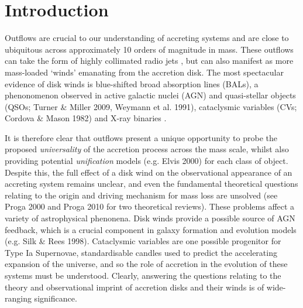 \documentclass[useAMS,usenatbib,onecolumn]{mn2e2}
\begin{document}



%
%
\section{Introduction}
Outflows are crucial to our understanding of accreting systems and are close to ubiquitous 
across approximately 10 orders of magnitude in mass. These outflows can take the form of 
highly collimated radio jets \citep{bellonijet2010}, but can also manifest as 
more mass-loaded `winds' emanating from the accretion disk. The most spectacular evidence of
disk winds is blue-shifted broad absorption lines (BALs), a phenonomenon observed in 
active galactic nuclei (AGN) and quasi-stellar objects (QSOs; Turner \& Miller 2009, 
Weymann et al. 1991\nocite{turnermiller2009, weymann1991}), cataclysmic variables 
(CVs; Cordova \& Mason 1982\nocite{cordova1982}) and X-ray binaries \citep{ioannau2003}.

It is therefore clear that outflows present a unique opportunity to probe the 
proposed {\sl universality} \citep[e.g.][]{mchardy2006, SKUK2012} of the accretion process across the mass scale, whilst also 
providing potential {\sl unification} models (e.g. Elvis 2000\nocite{elvis2000}) for each class of object. 
Despite this, the full effect of a disk wind on the observational appearance of an accreting system
remains unclear, and even the fundamental theoretical questions relating to the origin and driving mechanism
for mass loss are unsolved (see Proga 2000 and Proga 2010 for two theoretical reviews). 
These problems affect a variety of astrophysical phenonena. 
Disk winds provide a possible source of AGN feedback, which is a crucial component in galaxy formation and evolution models (e.g. Silk \& Rees 1998\nocite{silkrees1998}).
Cataclysmic variables are one possible progenitor for Type Ia Supernovae, standardisable candles
used to predict the accelerating expansion of the universe, and so the role of accretion in the evolution
of these systems must be understood. Clearly, answering the questions relating to the theory and observational 
imprint of accretion disks and their winds is of wide-ranging significance.
\end{document}
